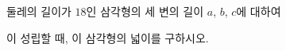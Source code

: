 둘레의 길이가 $18$인 삼각형의 세 변의 길이 $a$, $b$, $c$에 대하여\par\smallskip{}\par\smallskip\noindent 이 성립할 때, 이 삼각형의 넓이를 구하시오.
